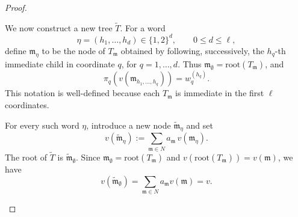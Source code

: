 \documentclass[10pt]{amsart}
\theoremstyle{plain}
\theoremstyle{definition}
\let\leq\leqslant
\begin{document}
\begin{proof}
\begin{enumerate}[1.]
\begin{enumerate}
We now construct a new tree \(\widetilde{T} \). For a word
\[
        \eta=(h_1,\ldots,h_d)\in\{1,2\}^d,\qquad 0\leq d\leq \ell,
\]
define \(\mathfrak{m}_\eta\) to be the node of \(T_{\mathfrak{m}}\) obtained by following, successively, the
\(h_q\)-th immediate child in coordinate \(q\), for \(q=1,\ldots,d\).  Thus
\(\mathfrak{m}_\emptyset=\mathrm{root}(T_{\mathfrak{m}})\), and
\[
        \pi_q(v(\mathfrak{m}_{h_1,\ldots,h_q}))=w_q^{(h_q)}.
\]
This notation is well-defined because each \(T_{\mathfrak{m}}\) is immediate in the first \(\ell\)
coordinates.

For every such word \(\eta\), introduce a new node \(\widetilde{\mathfrak{m}}_\eta\) and set
\[
        v(\widetilde{\mathfrak{m}}_\eta)
        :=
        \sum_{\mathfrak{m} \in N} a_{\mathfrak{m}}\, v(\mathfrak{m}_\eta).
\]
The root of \(\widetilde{T}\) is \(\widetilde{\mathfrak{m}}_\emptyset\).  Since \(\mathfrak{m}_\emptyset=\mathrm{root}(T_{\mathfrak{m}})\) and
\(v(\mathrm{root}(T_{\mathfrak{m}}))=v(\mathfrak{m})\), we have
\[
        v(\widetilde{\mathfrak{m}}_\emptyset)=\sum_{\mathfrak{m}\in N}a_{\mathfrak{m}} v(\mathfrak{m})=v.
\]


\end{enumerate}
\end{enumerate}
\end{proof}
\end{document}
